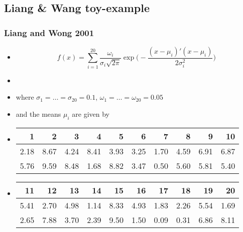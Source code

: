 \subsection{Liang \& Wang toy-example}

\begin{frame}
		\frametitle{Liang and Wong 2001}
	
	\begin{itemize}
		\item[] $$ f(x) = 
			\sum_{i=1}^{20} \frac{\omega_i}{ \sigma_i \sqrt{2 \pi} } \exp \Big( -\frac{(x - \mu_i)'(x - \mu_i)}{2 \sigma_i^2} \Big) $$

		\item[]
		\item[] where $\sigma_1 = \dots = \sigma_{20} = 0.1$, $\omega_1 = \dots = \omega_{20} = 0.05 $
		\item[] and the means $\mu_i$ are given by

		\item[] 
\begin{table}[ht]
\centering
\begin{tabular}{rrrrrrrrrr}
  \hline
1 & 2 & 3 & 4 & 5 & 6 & 7 & 8 & 9 & 10 \\ 
  \hline
2.18 & 8.67 & 4.24 & 8.41 & 3.93 & 3.25 & 1.70 & 4.59 & 6.91 & 6.87 \\ 
  5.76 & 9.59 & 8.48 & 1.68 & 8.82 & 3.47 & 0.50 & 5.60 & 5.81 & 5.40 \\ 
   \hline
\end{tabular}
\end{table}

		\item[]
\begin{table}[ht]
\centering
\begin{tabular}{rrrrrrrrrr}
  \hline
11 & 12 & 13 & 14 & 15 & 16 & 17 & 18 & 19 & 20 \\ 
  \hline
5.41 & 2.70 & 4.98 & 1.14 & 8.33 & 4.93 & 1.83 & 2.26 & 5.54 & 1.69 \\ 
  2.65 & 7.88 & 3.70 & 2.39 & 9.50 & 1.50 & 0.09 & 0.31 & 6.86 & 8.11 \\ 
   \hline
\end{tabular}
\end{table}
	\end{itemize} 	

			
\end{frame}
	

